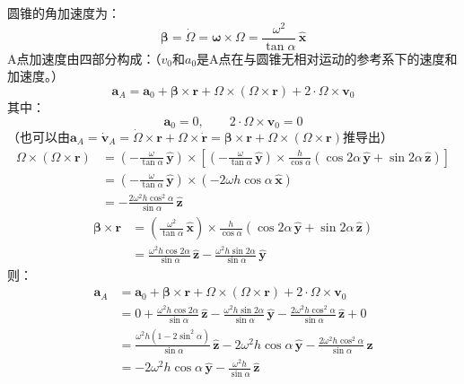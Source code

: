 \documentclass[a4paper,fontset=windows]{ctexart}
\begin{document}
\begin{itemize}
        圆锥的角加速度为：
        \[
        \bm{\beta} = \bm{\dot{\varOmega}} = \bm{\omega} \times \bm{\varOmega} = \frac{\omega^2}{\tan\alpha}\,\bm{\hat{x}}
        \]
        A点加速度由四部分构成：（$v_0$和$a_0$是A点在与圆锥无相对运动的参考系下的速度和加速度。）
        \[
        \bm{a}_A = \bm{a}_0 + \bm{\beta} \times \bm{r} + \bm{\varOmega} \times (\bm{\varOmega} \times \bm{r}) + 2 \cdot \bm{\varOmega} \times \bm{v}_0
        \]
        其中：
        \[
        \bm{a}_0 = 0,\qquad 2 \cdot \bm{\varOmega} \times \bm{v}_0 = 0
        \]
        （也可以由$\bm{a}_A = \bm{\dot{v}}_A = \bm{\dot{\varOmega}} \times \bm{r} + \bm{\varOmega} \times \bm{\dot{r}} = \bm{\beta} \times \bm{r} + \bm{\varOmega} \times (\bm{\varOmega} \times \bm{r})$推导出）
        \begin{align*}
        \bm{\varOmega} \times (\bm{\varOmega} \times \bm{r})
        &= \left(-\frac{\omega}{\tan\alpha}\,\bm{\hat{y}}\right) \times \left[\left(-\frac{\omega}{\tan\alpha}\,\bm{\hat{y}}\right) \times \frac{h}{\cos\alpha}(\cos{2\alpha}\,\bm{\hat{y}} + \sin{2\alpha}\,\bm{\hat{z}})\right] \\
        &= \left(-\frac{\omega}{\tan\alpha}\,\bm{\hat{y}}\right) \times \left(-2\omega h\cos\alpha\,\bm{\hat{x}}\right) \\
        &= -\frac{2\omega^2 h\cos^2\alpha}{\sin\alpha}\,\bm{\hat{z}}
        \end{align*}
        \begin{align*}
        \bm{\beta} \times \bm{r}
        &= \left(\frac{\omega^2}{\tan\alpha}\,\bm{\hat{x}}\right) \times \frac{h}{\cos\alpha}(\cos{2\alpha}\,\bm{\hat{y}} + \sin{2\alpha}\,\bm{\hat{z}}) \\
        &= \frac{\omega^2 h\cos{2\alpha}}{\sin\alpha}\,\bm{\hat{z}} - \frac{\omega^2 h\sin{2\alpha}}{\sin\alpha}\,\bm{\hat{y}}
        \end{align*}
        则：
        \begin{align*}
        \bm{a}_A
        &= \bm{a}_0 + \bm{\beta} \times \bm{r} + \bm{\varOmega} \times (\bm{\varOmega} \times \bm{r}) + 2 \cdot \bm{\varOmega} \times \bm{v}_0 \\
        &= 0 + \frac{\omega^2 h\cos{2\alpha}}{\sin\alpha}\,\bm{\hat{z}} - \frac{\omega^2 h\sin{2\alpha}}{\sin\alpha}\,\bm{\hat{y}} - \frac{2\omega^2 h\cos^2\alpha}{\sin\alpha}\,\bm{\hat{z}} + 0 \\
        &= \frac{\omega^2 h(1-2\sin^2\alpha)}{\sin\alpha}\,\bm{\hat{z}} - 2\omega^2 h\cos\alpha\,\bm{\hat{y}} - \frac{2\omega^2 h\cos^2\alpha}{\sin\alpha}\,\bm{\hat{z}} \\
        &= -2\omega^2 h\cos\alpha\,\bm{\hat{y}} - \frac{\omega^2 h}{\sin\alpha}\,\bm{\hat{z}}
        \end{align*}


\end{itemize}
\end{document}

